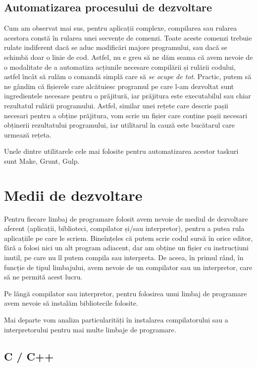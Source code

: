 \subsection{Automatizarea procesului de dezvoltare}
\label{sec:appdev:automation}

Cum am observat mai sus, pentru aplicații complexe, compilarea sau rularea
acestora constă în rularea unei secvențe de comenzi. Toate aceste comenzi
trebuie rulate indiferent dacă se aduc modificări majore programului, sau dacă
se schimbă doar o linie de cod. Astfel, nu e greu să ne dăm seama că avem nevoie
de o modalitate de a automatiza acțiunile necesare compilării și rulării
codului, astfel încât să rulăm o comandă simplă care să \textit{se ocupe de
tot}. Practic, putem să ne gândim că fișierele care alcătuiesc programul pe
care l-am dezvoltat sunt ingredientele necesare pentru o prăjitură, iar
prăjitura este executabilul sau chiar rezultatul rulării programului. Astfel,
similar unei rețete care descrie pașii necesari pentru a obține prăjitura, vom
scrie un fișier care conține pașii necesari obținerii rezultatului programului,
iar utilitarul în cauză este bucătarul care urmează rețeta.

Unele dintre utilitarele cele mai folosite pentru automatizarea acestor taskuri
sunt Make, Grunt, Gulp.

\section{Medii de dezvoltare}
\label{sec:appdev:dev-env}

Pentru fiecare limbaj de programare folosit avem nevoie de mediul de dezvoltare aferent (aplicații,
biblioteci, compilator și/sau interpretor), pentru a putea
rula aplicațiile pe care le scriem. Bineînțeles că putem scrie codul sursă în
orice editor, fără a folosi nici un alt program adiacent, dar am obține un fișier
cu instrucțiuni inutil, pe care nu îl putem compila sau interpreta. De aceea, în
primul rând, în funcție de tipul limbajului, avem nevoie de un compilator sau un
interpretor, care să ne permită acest lucru.

Pe lângă compilator sau interpretor, pentru folosirea unui limbaj de programare
avem nevoie să instalăm bibliotecile folosite.

Mai departe vom analiza particularități în instalarea compilatorului sau a
interpretorului pentru mai multe limbaje de programare.

\subsection{C / C++}
\label{sec:appdev:dev-env:c}

